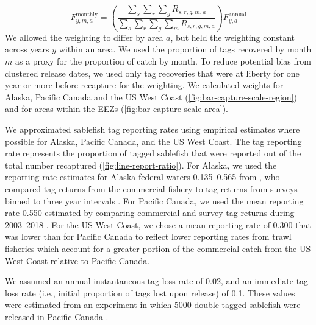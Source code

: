 \documentclass{article}
\begin{document}
%
\begin{equation}
  \label{eq:monthly-fishing}
  F_{y,m,a}^{\text{monthly}} = \left( \frac{\sum_s \sum_r \sum_g R_{s,r,g,m,a}}{\sum_s \sum_r \sum_g \sum_m R_{s,r,g,m,a}} \right) F_{y,a}^{\text{annual}}
\end{equation}
%
We allowed the weighting to differ by area $a$, but held the weighting constant across years $y$ within an area. We used the proportion of tags recovered by month $m$ as a proxy for the proportion of catch by month. To reduce potential bias from clustered release dates, we used only tag recoveries that were at liberty for one year or more before recapture for the weighting. We calculated weights for Alaska, Pacific Canada and the US West Coast (\autoref{fig:bar-capture-scale-region}) and for areas within the EEZs (\autoref{fig:bar-capture-scale-area}).

We approximated sablefish tag reporting rates using empirical estimates where possible for Alaska, Pacific Canada, and the US West Coast. The tag reporting rate represents the proportion of tagged sablefish that were reported out of the total number recaptured (\autoref{fig:line-report-ratio}). For Alaska, we used the reporting rate estimates for Alaska federal waters \num{0.135}--\num{0.565} from \cite{hanselman2015}, who compared tag returns from the commercial fishery to tag returns from surveys binned to three year intervals \cite[][]{heifetz2001}. For Pacific Canada, we used the mean reporting rate \num{0.550} estimated by comparing commercial and survey tag returns during 2003--2018 \cite[][]{aulthouse2020}. For the US West Coast, we chose a mean reporting rate of \num{0.300} that was lower than for Pacific Canada to reflect lower reporting rates from trawl fisheries which account for a greater portion of the commercial catch from the US West Coast relative to Pacific Canada. 

We assumed an annual instantaneous tag loss rate  of \num{0.02}, and an immediate tag loss rate (i.e., initial proportion of tags lost upon release) of \num{0.1}. These values were estimated from an experiment in which \num{5000} double-tagged sablefish were released in Pacific Canada \cite[][]{saunders1990}.
\end{document}
